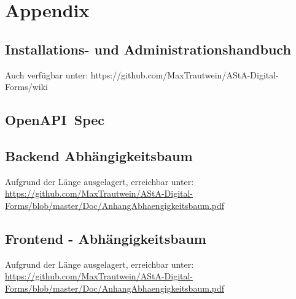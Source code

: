 \chapter{Appendix}\label{ch:appendix}

\section{Installations- und Administrationshandbuch}\label{sec:installations--und-administrationshandbuch}
Auch verfügbar unter: https://github.com/MaxTrautwein/AStA-Digital-Forms/wiki


\section{OpenAPI~Spec}\label{sec:openapi-spec}




\section{Backend Abhängigkeitsbaum}\label{sec:backend-abhangigkeitsbaum}
Aufgrund der Länge ausgelagert, erreichbar unter: \url{https://github.com/MaxTrautwein/AStA-Digital-Forms/blob/master/Doc/AnhangAbhaengigkeitsbaum.pdf}

\section{Frontend - Abhängigkeitsbaum}\label{sec:frontend---abhangigkeitsbaum}
Aufgrund der Länge ausgelagert, erreichbar unter: \url{https://github.com/MaxTrautwein/AStA-Digital-Forms/blob/master/Doc/AnhangAbhaengigkeitsbaum.pdf}